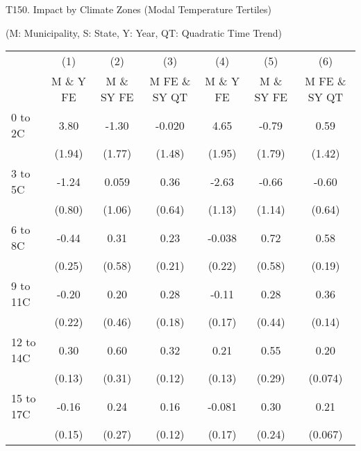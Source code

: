 \documentclass[paper=letterpaper, fontsize=11pt]{article} %
\begin{document}
\newpage

\begin{center}
T150. Impact by Climate Zones (Modal Temperature Tertiles)

(M: Municipality, S: State, Y: Year, QT: Quadratic Time Trend)
\end{center}

\begin{longtable}{l*{6}{c}} \hline\hline\endfirsthead\hline\endhead\hline\endfoot\endlastfoot
                    &\multicolumn{1}{c}{(1)}&\multicolumn{1}{c}{(2)}&\multicolumn{1}{c}{(3)}&\multicolumn{1}{c}{(4)}&\multicolumn{1}{c}{(5)}&\multicolumn{1}{c}{(6)}\\
                    &\multicolumn{1}{c}{M \& Y FE}&\multicolumn{1}{c}{M \& SY FE}&\multicolumn{1}{c}{M FE \& SY QT}&\multicolumn{1}{c}{M \& Y FE}&\multicolumn{1}{c}{M \& SY FE}&\multicolumn{1}{c}{M FE \& SY QT}\\
\hline
0 to 2C             &        3.80&       -1.30&      -0.020&        4.65&       -0.79&        0.59\\
                    &      (1.94)&      (1.77)&      (1.48)&      (1.95)&      (1.79)&      (1.42)\\
3 to 5C             &       -1.24&       0.059&        0.36&       -2.63&       -0.66&       -0.60\\
                    &      (0.80)&      (1.06)&      (0.64)&      (1.13)&      (1.14)&      (0.64)\\
6 to 8C             &       -0.44&        0.31&        0.23&      -0.038&        0.72&        0.58\\
                    &      (0.25)&      (0.58)&      (0.21)&      (0.22)&      (0.58)&      (0.19)\\
9 to 11C            &       -0.20&        0.20&        0.28&       -0.11&        0.28&        0.36\\
                    &      (0.22)&      (0.46)&      (0.18)&      (0.17)&      (0.44)&      (0.14)\\
12 to 14C           &        0.30&        0.60&        0.32&        0.21&        0.55&        0.20\\
                    &      (0.13)&      (0.31)&      (0.12)&      (0.13)&      (0.29)&     (0.074)\\
15 to 17C           &       -0.16&        0.24&        0.16&      -0.081&        0.30&        0.21\\
                    &      (0.15)&      (0.27)&      (0.12)&      (0.17)&      (0.24)&     (0.067)\\

\end{longtable}
\end{document}
